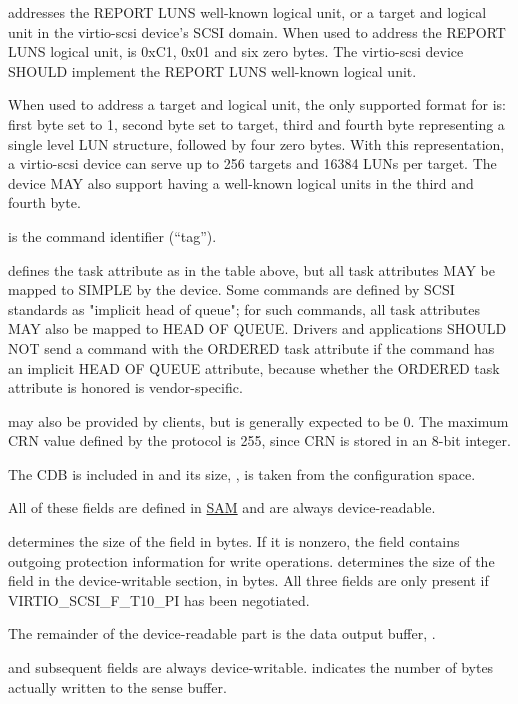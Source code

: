  addresses the REPORT LUNS well-known logical unit, or
a target and logical unit in the virtio-scsi device's SCSI domain.
When used to address the REPORT LUNS logical unit,  is 0xC1,
0x01 and six zero bytes.  The virtio-scsi device SHOULD implement the
REPORT LUNS well-known logical unit.

When used to address a target and logical unit, the only supported format
for  is: first byte set to 1, second byte set to target,
third and fourth byte representing a single level LUN structure, followed
by four zero bytes. With this representation, a virtio-scsi device can
serve up to 256 targets and 16384 LUNs per target.  The device MAY also
support having a well-known logical units in the third and fourth byte.

 is the command identifier (``tag'').

 defines the task attribute as in the table above, but
all task attributes MAY be mapped to SIMPLE by the device.  Some commands
are defined by SCSI standards as "implicit head of queue"; for such
commands, all task attributes MAY also be mapped to HEAD OF QUEUE.
Drivers and applications SHOULD NOT send a command with the ORDERED
task attribute if the command has an implicit HEAD OF QUEUE attribute,
because whether the ORDERED task attribute is honored is vendor-specific.

 may also be provided by clients, but is generally expected
to be 0. The maximum CRN value defined by the protocol is 255, since
CRN is stored in an 8-bit integer.

The CDB is included in  and its size, ,
is taken from the configuration space.

All of these fields are defined in \hyperref[intro:SAM]{SAM} and are
always device-readable.

 determines the size of the  field
in bytes.  If it is nonzero, the  field contains outgoing
protection information for write operations.   determines
the size of the  field in the device-writable section, in bytes.
All three fields are only present if VIRTIO_SCSI_F_T10_PI has been negotiated.

The remainder of the device-readable part is the data output buffer,
.

 and subsequent fields are always device-writable. 
indicates the number of bytes actually written to the sense
buffer.

